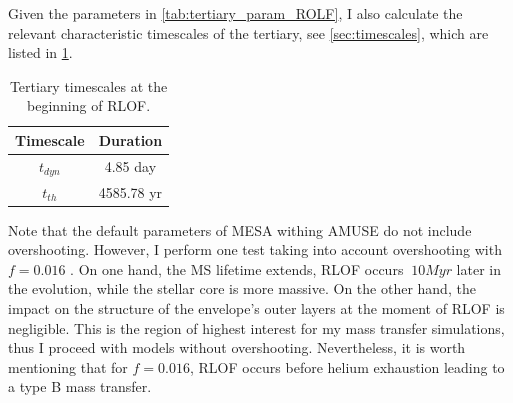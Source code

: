 Given the parameters in \cref{tab:tertiary_param_ROLF}, I also calculate the relevant characteristic timescales of the tertiary, see \cref{sec:timescales}, which are listed in \cref{tab:tertiary_timescale_ROLF}.
\begin{table}[H]
    \centering
    \begin{tabular}{| c | c |}
       Timescale & Duration \\
       \hline
       $t_{dyn}$ & 4.85 day\\
       $t_{th}$ & 4585.78 yr 
    \end{tabular}
    \caption{ Tertiary timescales at the beginning of RLOF.}
    \label{tab:tertiary_timescale_ROLF}
\end{table}

Note that the default parameters of MESA withing AMUSE do not include overshooting. However, I perform one test taking into account overshooting with $f=0.016$ \citep{herwig2000evolution}. On one hand, the MS lifetime extends, RLOF occurs $~10Myr$ later in the evolution, while the stellar core is more massive. On the other hand, the impact on the structure of the envelope's outer layers at the moment of RLOF is negligible. This is the region of highest interest for my mass transfer simulations, thus I proceed with models without overshooting. Nevertheless, it is worth mentioning that for $f=0.016$, RLOF occurs before helium exhaustion leading to a type B mass transfer.

